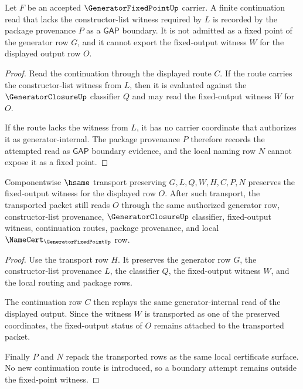 \begin{theorem}
\label{thm:generator-fixed-point-non-escape}
Let $F$ be an accepted $\GeneratorFixedPointUp$ carrier. A finite continuation read that lacks the constructor-list witness required by $L$ is recorded by the package provenance $P$ as a $\mathsf{GAP}$ boundary. It is not admitted as a fixed point of the generator row $G$, and it cannot export the fixed-output witness $W$ for the displayed output row $O$.
\end{theorem}
\begin{proof}
Read the continuation through the displayed route $C$. If the route carries the constructor-list witness from $L$, then it is evaluated against the $\GeneratorClosureUp$ classifier $Q$ and may read the fixed-output witness $W$ for $O$.

If the route lacks the witness from $L$, it has no carrier coordinate that authorizes it as generator-internal. The package provenance $P$ therefore records the attempted read as $\mathsf{GAP}$ boundary evidence, and the local naming row $N$ cannot expose it as a fixed point.
\end{proof}

\begin{theorem}
\label{thm:generator-fixed-point-fixed-witness}
Componentwise $\hsame$ transport preserving $G,L,Q,W,H,C,P,N$ preserves the fixed-output witness for the displayed row $O$. After such transport, the transported packet still reads $O$ through the same authorized generator row, constructor-list provenance, $\GeneratorClosureUp$ classifier, fixed-output witness, continuation routes, package provenance, and local $\NameCert_{\GeneratorFixedPointUp}$ row.
\end{theorem}
\begin{proof}
Use the transport row $H$. It preserves the generator row $G$, the constructor-list provenance $L$, the classifier $Q$, the fixed-output witness $W$, and the local routing and package rows.

The continuation row $C$ then replays the same generator-internal read of the displayed output. Since the witness $W$ is transported as one of the preserved coordinates, the fixed-output status of $O$ remains attached to the transported packet.

Finally $P$ and $N$ repack the transported rows as the same local certificate surface. No new continuation route is introduced, so a boundary attempt remains outside the fixed-point witness.
\end{proof}

